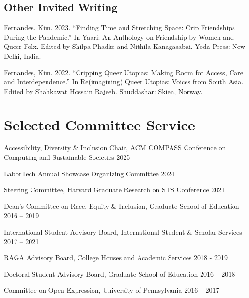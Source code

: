 \documentclass[11pt,letterpaper]{report}
\newcommand{\listitemspace}{0.25em}
\renewenvironment{itemize}{\begin{list}{}{\setlength{\leftmargin}{0em}\setlength{\parskip}{0em}\setlength{\itemsep}{\listitemspace}\setlength{\parsep}{\listitemspace}}}{\end{list}}
\begin{document}
    \subsection*{Other Invited Writing}
    \begin{itemize}
        \item Fernandes, Kim. 2023. “Finding Time and Stretching Space: Crip Friendships During the Pandemic.” In Yaari: An Anthology on Friendship by Women and Queer Folx. Edited by Shilpa Phadke and Nithila Kanagasabai. Yoda Press: New Delhi, India.
        \item Fernandes, Kim. 2022. “Cripping Queer Utopias: Making Room for Access, Care and Interdependence.” In Re(imagining) Queer Utopias: Voices from South Asia. Edited by Shahkawat Hossain Rajeeb. Shuddashar: Skien, Norway.
    \end{itemize}

    \section*{Selected Committee Service}
    \begin{itemize}
        \item Accessibility, Diversity \& Inclusion Chair, ACM COMPASS Conference on Computing and Sustainable Societies 2025
        \item LaborTech Annual Showcase Organizing Committee 2024
        \item Steering Committee, Harvard Graduate Research on STS Conference 2021
        \item Dean’s Committee on Race, Equity \& Inclusion, Graduate School of Education 2016 – 2019
        \item International Student Advisory Board, International Student \& Scholar Services 2017 – 2021
        \item RAGA Advisory Board, College Houses and Academic Services 2018 - 2019
        \item Doctoral Student Advisory Board, Graduate School of Education 2016 – 2018
        \item Committee on Open Expression, University of Pennsylvania 2016 – 2017
    \end{itemize}
\end{document}
